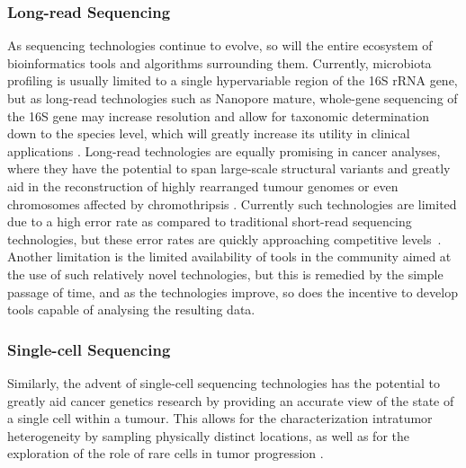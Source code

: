 \subsubsection{Long-read Sequencing}
As sequencing technologies continue to evolve, so will the entire ecosystem of bioinformatics tools and algorithms surrounding them. Currently, microbiota profiling is usually limited to a single hypervariable region of the 16S rRNA gene, but as long-read technologies such as Nanopore mature, whole-gene sequencing of the 16S gene may increase resolution and allow for taxonomic determination down to the species level, which will greatly increase its utility in clinical applications \cite{toma2014single,franzen2015improved}. Long-read technologies are equally promising in cancer analyses, where they have the potential to span large-scale structural variants and greatly aid in the reconstruction of highly rearranged tumour genomes or even chromosomes affected by chromothripsis \cite{norris2016nanopore,nattestad2018complex}. Currently such technologies are limited due to a high error rate as compared to traditional short-read sequencing technologies, but these error rates are quickly approaching competitive levels~\cite{kraft2019long}. Another limitation is the limited availability of tools in the community aimed at the use of such relatively novel technologies, but this is remedied by the simple passage of time, and as the technologies improve, so does the incentive to develop tools capable of analysing the resulting data.

\subsubsection{Single-cell Sequencing}
Similarly, the advent of single-cell sequencing technologies has the potential to greatly aid cancer genetics research by providing an accurate view of the state of a single cell within a tumour. This allows for the characterization intratumor heterogeneity by sampling physically distinct locations, as well as for the exploration of the role of rare cells in tumor progression \cite{navin2015first}.

